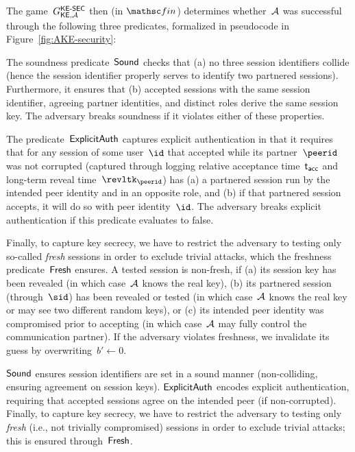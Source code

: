 The game~$G^{\mathsf{KE{\text{\normalfont-}}SEC}}_{\mathsf{KE},\mathcal{A}}$ then (in $\Finalize$) determines whether~$\mathcal{A}$ was successful through the following three predicates,
formalized in pseudocode in Figure~\ref{fig:AKE-security}:
\iffull
\begin{description}
	\setlength{\itemsep}{0.5em} %
	
	\item[$\Sound$.]
	The soundness predicate~$\Sound$ checks that (a) no three session identifiers collide (hence the session identifier properly serves to identify two partnered sessions).
	Furthermore, it ensures that (b) accepted sessions with the same session identifier, agreeing partner identities, and distinct roles derive the same session key.
	\iffull
	The adversary breaks soundness if it violates either of these properties.
	\fi
	
	\item[$\ExplicitAuth$.]
	The predicate~$\ExplicitAuth$ captures explicit authentication in that it requires that for any session of some user~$\id$ that accepted while its partner~$\peerid$ was not corrupted (captured through logging relative acceptance time~$\mathsf{t_{acc}}$ and long-term reveal time~$\revltk_{\peerid}$) has
	(a) a partnered session run by the intended peer identity and in an opposite role,
	and (b) if that partnered session accepts, it will do so with peer identity~$\id$.
	\iffull
	The adversary breaks explicit authentication if this predicate evaluates to false.
	\fi
	
	\item[$\Fresh$.]
	Finally, to capture key secrecy, we have to restrict the adversary to testing only so-called \emph{fresh} sessions in order to exclude trivial attacks, which the freshness predicate~$\Fresh$ ensures.
	A tested session is non-fresh, if
	(a) its session key has been revealed (in which case~$\mathcal{A}$ knows the real key),
	(b) its partnered session (through~$\sid$) has been revealed or tested (in which case~$\mathcal{A}$ knows the real key or may see two different random keys),
	or (c) its intended peer identity was compromised prior to accepting (in which case~$\mathcal{A}$ may fully control the communication partner).
	\iffull
	If the adversary violates freshness, we invalidate its guess by overwriting~$b' \gets 0$.
	\fi
\end{description}
\else
$\Sound$ ensures session identifiers are set in a sound manner (non-colliding, ensuring agreement on session keys).
$\ExplicitAuth$ encodes explicit authentication, requiring that accepted sessions agree on the intended peer (if non-corrupted).
Finally, to capture key secrecy, we have to restrict the adversary to testing only \emph{fresh} (i.e., not trivially compromised) sessions in order to exclude trivial attacks; this is ensured through~$\Fresh$.
\fi

